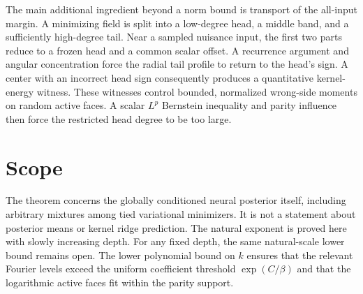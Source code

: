 \documentclass[11pt]{article}
\theoremstyle{remark}\newtheorem{remark}[theorem]{Remark}
\begin{document}
The main additional ingredient beyond a norm bound is transport of the
all-input margin. A minimizing field is split into a low-degree head,
a middle band, and a sufficiently high-degree tail. Near a sampled
nuisance input, the first two parts reduce to a frozen head and a common
scalar offset. A recurrence argument and angular concentration force
the radial tail profile to return to the head's sign. A center with an
incorrect head sign consequently produces a quantitative kernel-energy
witness. These witnesses control bounded, normalized wrong-side moments
on random active faces. A scalar $L^p$ Bernstein inequality and parity
influence then force the restricted head degree to be too large.




















\section{Scope}
The theorem concerns the globally conditioned neural posterior itself,
including arbitrary mixtures among tied variational minimizers. It is
not a statement about posterior means or kernel ridge prediction.
The natural exponent is proved here with slowly increasing depth.
For any fixed depth, the same natural-scale lower bound remains open.
The lower polynomial bound on $k$ ensures that the relevant Fourier
levels exceed the uniform coefficient threshold $\exp(C/\beta)$ and
that the logarithmic active faces fit within the parity support.
\end{document}

